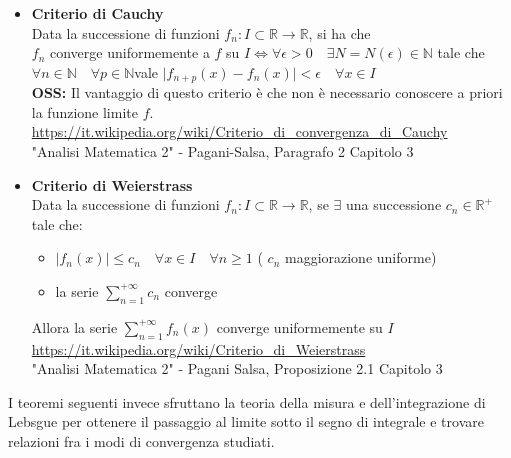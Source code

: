 \documentclass[12pt,a4paper]{report}
\begin{document}
\begin{itemize}
\item \textbf{Criterio di Cauchy} \\
Data la successione di funzioni \(f_{n}: I \subset \mathbb{R} \rightarrow \mathbb{R}\), si ha che \\
\(f_{n} \) converge uniformemente a \(f\) su \(I \iff \forall \epsilon >0 \quad \exists N=N(\epsilon)\in \mathbb{N}\) tale che \quad \(\forall n \in \mathbb{N} \quad \forall p \in \mathbb{N} \)\quad vale \quad \( \mid f_{n+p}(x)-f_{n}(x) \mid < \epsilon \quad \forall x \in I\) \\
\textbf{OSS:} Il vantaggio di questo criterio è che non è necessario conoscere a priori la funzione limite \(f\).\\
\newline
\url{https://it.wikipedia.org/wiki/Criterio_di_convergenza_di_Cauchy}\\
"Analisi Matematica 2" - Pagani-Salsa, Paragrafo 2 Capitolo 3

\item \textbf{Criterio di Weierstrass}\\
Data la successione di funzioni \(f_{n}: I \subset \mathbb{R} \rightarrow \mathbb{R}\), se \( \exists\) una successione \(c_{n} \in \mathbb{R}^+\) tale che:
\begin{itemize}
\item \(| f_{n}(x)| \leq c_{n} \quad \forall x \in I \quad \forall n \geq 1\) \quad ( \(c_{n}\) maggiorazione uniforme)
\item la serie \(\sum_{n=1}^{+\infty}c_{n}\) converge
\end{itemize}
Allora la serie \(\displaystyle{\sum_{n=1}^{+\infty}f_{n}(x)}\) converge uniformemente su \(I\) \\
\url{https://it.wikipedia.org/wiki/Criterio_di_Weierstrass}\\
"Analisi Matematica 2" - Pagani Salsa, Proposizione 2.1 Capitolo 3

\end{itemize}
I teoremi seguenti invece sfruttano la teoria della misura e dell'integrazione di Lebsgue per ottenere il passaggio al limite sotto il segno di integrale e trovare relazioni fra i modi di convergenza studiati.
\end{document}
